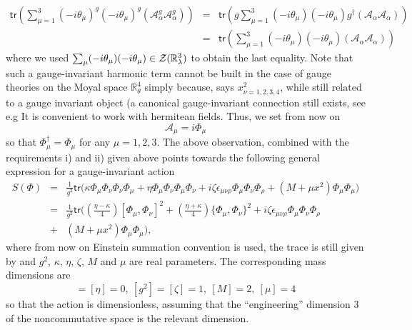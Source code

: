 \documentclass[10pt]{book}
\newcommand{\tr}{\mathsf{tr}}
\theoremstyle{break}
\begin{document}
%
\begin{eqnarray*}
\tr(\sum_{\mu=1}^3(-i\theta_\mu)^g (-i\theta_\mu)^g (\mathcal{A}^g_\alpha \mathcal{A}^g_\alpha) ) &=& 
\tr( g \sum_{\mu=1}^3(-i\theta_\mu)(-i\theta_\mu) g^\dag (\mathcal{A}_\alpha \mathcal{A}_\alpha) )\nonumber\\
&=& \tr( \sum_{\mu=1}^3(-i\theta_\mu)(-i\theta_\mu) (\mathcal{A}_\alpha \mathcal{A}_\alpha) )
\end{eqnarray*}
%
where we used $\sum_\mu(-i\theta_\mu)(-i\theta_\mu)\in{\cal{Z}}(\mathbb{R}^3_\lambda)$ to obtain the last equality. Note that such a gauge-invariant harmonic term cannot be built in the case of gauge theories on the Moyal space $\mathbb{R}^4_\theta$ %
simply because, says $x_{\nu=1,2,3,4}^2$, while still related to a gauge invariant object (a canonical gauge-invariant connection still exists, see e.g %
%
It is convenient to work with hermitean fields. Thus, we set from now on
\begin{equation*}
\mathcal{A}_\mu = i \Phi_\mu
\end{equation*}
so that $\Phi^\dag_\mu = \Phi_\mu$ for any $\mu=1,2,3$. The above observation, combined with the requirements i) and ii) given above points towards the following general expression for a gauge-invariant action%
%
\begin{eqnarray*}%
S(\Phi)&=&\frac{1}{g^2} \tr\big( \kappa \Phi_\mu \Phi_\nu \Phi_\nu \Phi_\mu + \eta \Phi_\mu \Phi_\nu \Phi_\mu \Phi_\nu + i \zeta \epsilon_{\mu\nu\rho} \Phi_\mu \Phi_\nu \Phi_\rho + (M+\mu x^2) \Phi_\mu \Phi_\mu \big)\nonumber\\
&=&\frac{1}{g^2} \tr\big((\frac{\eta-\kappa}{4})[\Phi_\mu,\Phi_\nu]^2+(\frac{\eta+\kappa}{4})\{\Phi_\mu,\Phi_\nu \}^2
+ i \zeta \epsilon_{\mu\nu\rho} \Phi_\mu \Phi_\nu \Phi_\rho\nonumber\\
&+& (M+\mu x^2) \Phi_\mu \Phi_\mu \big), %
\end{eqnarray*}
%
where from now on Einstein summation convention is used, the trace is still given by %
and $g^2$, $\kappa$, $\eta$, $\zeta$, $M$ and $\mu$ are real parameters. The corresponding mass dimensions are
\begin{equation*}
[\kappa]=[\eta]=0,\ [g^2]=[\zeta]=1,\ [M]=2,\ [\mu]=4%
\end{equation*}
so that the action %
is dimensionless, assuming that the ``engineering'' dimension $3$ of the noncommutative space is the relevant dimension.\par%
\end{document}
